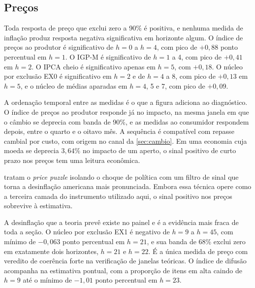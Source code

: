 \documentclass[preprint,authoryear,review,12pt]{elsarticle}
\begin{document}
\subsection{Preços}

Toda resposta de preço que exclui zero a 90\% é positiva, e nenhuma medida de inflação produz resposta negativa significativa em horizonte algum. O índice de preços ao produtor é significativo de $h = 0$ a $h = 4$, com pico de $+0{,}88$ ponto percentual em $h = 1$. O IGP-M é significativo de $h = 1$ a 4, com pico de $+0{,}41$ em $h = 2$. O IPCA cheio é significativo apenas em $h = 5$, com $+0{,}18$. O núcleo por exclusão EX0 é significativo em $h = 2$ e de $h = 4$ a 8, com pico de $+0{,}13$ em $h = 5$, e o núcleo de médias aparadas em $h = 4$, 5 e 7, com pico de $+0{,}09$.



A ordenação temporal entre as medidas é o que a figura adiciona ao diagnóstico. O índice de preços ao produtor responde já no impacto, na mesma janela em que o câmbio se deprecia com banda de 90\%, e as medidas ao consumidor respondem depois, entre o quarto e o oitavo mês. A sequência é compatível com repasse cambial por custo, com origem no canal da \autoref{sec:cambio}. Em uma economia cuja moeda se deprecia $3{,}64\%$ no impacto de um aperto, o sinal positivo de curto prazo nos preços tem uma leitura econômica.

\cite{jarocinski2020} tratam o \textit{price puzzle} isolando o choque de política com um filtro de sinal que torna a desinflação americana mais pronunciada. Embora essa técnica opere como a terceira camada do instrumento utilizado aqui, o sinal positivo nos preços sobrevive à estimativa.

A desinflação que a teoria prevê existe no painel e é a evidência mais fraca de toda a seção. O núcleo por exclusão EX1 é negativo de $h = 9$ a $h = 45$, com mínimo de $-0{,}063$ ponto percentual em $h = 21$, e sua banda de 68\% exclui zero em exatamente dois horizontes, $h = 21$ e $h = 22$. É a única medida de preço com veredito de coerência forte na verificação de janelas teóricas. O índice de difusão acompanha na estimativa pontual, com a proporção de itens em alta caindo de $h = 9$ até o mínimo de $-1{,}01$ ponto percentual em $h = 23$.
\end{document}
